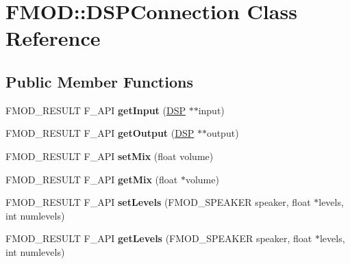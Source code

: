 \hypertarget{class_f_m_o_d_1_1_d_s_p_connection}{\section{F\-M\-O\-D\-:\-:D\-S\-P\-Connection Class Reference}
\label{class_f_m_o_d_1_1_d_s_p_connection}
}
\subsection*{Public Member Functions}
\begin{DoxyCompactItemize}
\item 
\hypertarget{class_f_m_o_d_1_1_d_s_p_connection_a4885524212e3f791debfac1ec259ee6a}{F\-M\-O\-D\-\_\-\-R\-E\-S\-U\-L\-T F\-\_\-\-A\-P\-I {\bfseries get\-Input} (\hyperlink{class_f_m_o_d_1_1_d_s_p}{D\-S\-P} $\ast$$\ast$input)}\label{class_f_m_o_d_1_1_d_s_p_connection_a4885524212e3f791debfac1ec259ee6a}

\item 
\hypertarget{class_f_m_o_d_1_1_d_s_p_connection_a813e7b67af3dcf1fad6b8ed73ad99a8d}{F\-M\-O\-D\-\_\-\-R\-E\-S\-U\-L\-T F\-\_\-\-A\-P\-I {\bfseries get\-Output} (\hyperlink{class_f_m_o_d_1_1_d_s_p}{D\-S\-P} $\ast$$\ast$output)}\label{class_f_m_o_d_1_1_d_s_p_connection_a813e7b67af3dcf1fad6b8ed73ad99a8d}

\item 
\hypertarget{class_f_m_o_d_1_1_d_s_p_connection_a67b8373d3bead0903909ac035acfa47d}{F\-M\-O\-D\-\_\-\-R\-E\-S\-U\-L\-T F\-\_\-\-A\-P\-I {\bfseries set\-Mix} (float volume)}\label{class_f_m_o_d_1_1_d_s_p_connection_a67b8373d3bead0903909ac035acfa47d}

\item 
\hypertarget{class_f_m_o_d_1_1_d_s_p_connection_a21bceb2d4e9d4f951c137d7a2bc95572}{F\-M\-O\-D\-\_\-\-R\-E\-S\-U\-L\-T F\-\_\-\-A\-P\-I {\bfseries get\-Mix} (float $\ast$volume)}\label{class_f_m_o_d_1_1_d_s_p_connection_a21bceb2d4e9d4f951c137d7a2bc95572}

\item 
\hypertarget{class_f_m_o_d_1_1_d_s_p_connection_a4ff2362aa7cfb0b5397919ca97f27d60}{F\-M\-O\-D\-\_\-\-R\-E\-S\-U\-L\-T F\-\_\-\-A\-P\-I {\bfseries set\-Levels} (F\-M\-O\-D\-\_\-\-S\-P\-E\-A\-K\-E\-R speaker, float $\ast$levels, int numlevels)}\label{class_f_m_o_d_1_1_d_s_p_connection_a4ff2362aa7cfb0b5397919ca97f27d60}

\item 
\hypertarget{class_f_m_o_d_1_1_d_s_p_connection_aa3a1e3bb3228c2bfdfba033657574013}{F\-M\-O\-D\-\_\-\-R\-E\-S\-U\-L\-T F\-\_\-\-A\-P\-I {\bfseries get\-Levels} (F\-M\-O\-D\-\_\-\-S\-P\-E\-A\-K\-E\-R speaker, float $\ast$levels, int numlevels)}\label{class_f_m_o_d_1_1_d_s_p_connection_aa3a1e3bb3228c2bfdfba033657574013}


\end{DoxyCompactItemize}
